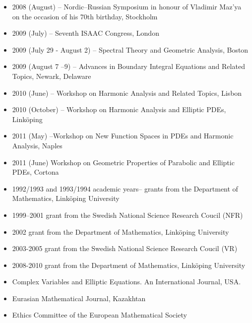 \documentclass{article}
\begin{document}
\begin{itemize}
        \item 2008 (August) -- Nordic--Russian Symposium in honour of Vladimir Maz'ya on the occasion of his 70th birthday, Stockholm
         \item 2009 (July) -- Seventh ISAAC Congress, London 
       \item 2009 (July 29 - August 2)  -- Spectral Theory and Geometric Analysis, Boston 
       \item 2009 (August 7 --9) -- Advances in Boundary Integral Equations and Related Topics, Newark, Delaware 
       \item 2010 (June) -- Workshop on Harmonic Analysis and Related Topics, Lisbon
       \item 2010 (October) -- Workshop on Harmonic Analysis and Elliptic PDEs, Link\"oping
        \item 2011 (May) --Workshop on New Function Spaces in PDEs and Harmonic Analysis, Naples
        \item 2011 (June) Workshop on Geometric Properties of Parabolic and Elliptic PDEs, Cortona
\end{itemize}

\bigskip

    \begin{itemize}
         \item 1992/1993 and 1993/1994 academic years-- grants from 
the Department of Mathematics, Link\"oping University
          \item 1999--2001 grant from the Swedish National Science 
Research Coucil (NFR)
         \item 2002 grant from the Department of Mathematics, 
Link\"oping University
         \item 2003-2005 grant from the Swedish National Science 
Research Coucil (VR)
                 \item 2008-2010 grant from the Department of Mathematics, 
Link\"oping University
     \end{itemize}


   \begin{itemize}
     \item Complex Variables and Elliptic Equations. An International Journal, USA.
     \item Eurasian Mathematical Journal, Kazakhtan
     \end{itemize}

  \begin{itemize}
     \item Ethics Committee  of the European Mathematical Society
   \end{itemize}
   
\end{document}

